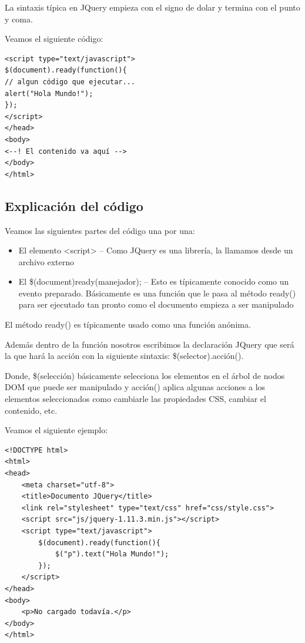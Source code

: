 \documentclass[11pt]{article}
\begin{document}
La sintaxis típica en JQuery empieza con el signo de dolar y termina con el punto y coma. 

Veamos el siguiente código:

\begin{verbatim}
<script type="text/javascript">
$(document).ready(function(){
// algun código que ejecutar...
alert("Hola Mundo!");
});
</script>
</head>
<body>
<--! El contenido va aquí -->
</body>
</html>
\end{verbatim}

\subsection*{Explicación del código}
\label{sec:org7fa2caf}

Veamos las siguientes partes del código una por una:

\begin{itemize}
\item El elemento <script> -- Como JQuery es una librería, la llamamos desde un archivo externo
\item El \$(document)ready(manejador); -- Esto es típicamente conocido como un evento preparado. Básicamente es una función que le pasa al método ready() para ser ejecutado tan pronto como el documento empieza a ser manipulado
\end{itemize}

El método ready() es típicamente usado como una función anónima. 

Además dentro de la función nosotros escribimos la declaración JQuery que será la que hará la acción con la siguiente sintaxis: \$(selector).acción().

Donde, \$(selección) básicamente selecciona los elementos en el árbol de nodos DOM que puede ser manipulado y acción() aplica algunas acciones a los elementos seleccionados como cambiarle las propiedades CSS, cambiar el contenido, etc. 

Veamos el siguiente ejemplo:

\begin{verbatim}
<!DOCTYPE html>
<html>
<head>
    <meta charset="utf-8">
    <title>Documento JQuery</title>
    <link rel="stylesheet" type="text/css" href="css/style.css">
    <script src="js/jquery-1.11.3.min.js"></script>
    <script type="text/javascript">
        $(document).ready(function(){
            $("p").text("Hola Mundo!");
        });
    </script>
</head>
<body>
    <p>No cargado todavía.</p>
</body>
</html>
\end{verbatim}
\end{document}
